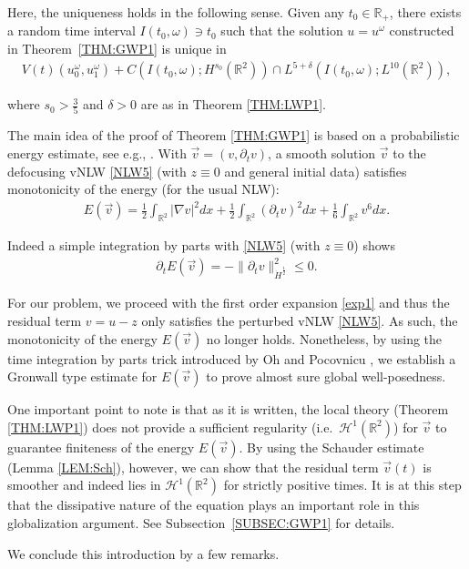 \documentclass[letterpaper, 11pt,  reqno]{amsart}
\newtheorem{remark}[theorem]{Remark}
\newcommand{\1}{\hspace{0.5mm}\text{I}\hspace{0.2mm}}
\newcommand{\noi}{\noindent}
\newcommand{\R}{\mathbb{R}}
\newcommand{\dl}{\delta}
\newcommand{\nb}{\nabla}
\newcommand{\dt}{\partial_t}
\renewcommand{\o}{\omega}
\renewcommand{\H}{\mathcal{H}}
\numberwithin{equation}{section}
\numberwithin{theorem}{section}
\begin{document}
Here, the uniqueness holds in the following sense.
Given any $t_0 \in \R_+$, there exists a random time interval $I(t_0, \o) \ni t_0$
such that the solution $u = u^\o$ constructed in Theorem~\ref{THM:GWP1}
is unique in 
\begin{align*}
V(t)(u_0^\o, u_1^\o) +  C(I(t_0, \o); H^{s_0} (\R^2))
\cap  L^{5+\dl}(I(t_0, \o);  L^{10}(\R^2)), 
\end{align*}

\noi
where $s_0 >\frac 35$ and $\dl > 0$ are as in Theorem \ref{THM:LWP1}.

The main idea of the proof of Theorem \ref{THM:GWP1} is based
on a probabilistic energy estimate, see e.g.,  \cite{BT1, OP}.
With $\vec v = (v, \dt v)$, 
a smooth solution $\vec v $ to the 
defocusing vNLW \eqref{NLW5}
(with $z \equiv 0$ and general initial data)
satisfies monotonicity of the energy (for the usual NLW):
\begin{align}
E(\vec v) = \frac 12 \int_{\R^2} |\nb v|^2 dx + \frac 12 \int_{\R^2} (\dt v)^2 dx
+ \frac 16 \int_{\R^2} v^6 dx .
\label{E0}
\end{align}

\noi
Indeed a simple integration by parts with \eqref{NLW5} (with $z \equiv 0$) shows
\begin{align*}
\dt E(\vec v) = - \|\dt v\|_{\dot H^\frac{1}{2}}^2 \leq 0.
\end{align*}


\noi
For our problem, we proceed with 
 the first order expansion \eqref{exp1}
 and thus 
the residual term $v = u-z$ only satisfies the perturbed vNLW \eqref{NLW5}.
As such,  the monotonicity of the energy $E(\vec v)$ no longer holds.
Nonetheless, by using the time integration by parts trick introduced
by Oh and Pocovnicu  \cite{OP}, 
we establish a Gronwall type estimate 
for $E(\vec v)$ to prove almost sure global well-posedness.

One important point to note is that as it is written, 
the local theory (Theorem \ref{THM:LWP1}) does not provide
a sufficient regularity (i.e.~$\H^1(\R^2)$) for $\vec v$ to guarantee finiteness of the energy $E(\vec v)$.
By using the Schauder estimate (Lemma \ref{LEM:Sch}), however, 
we can show that the residual term $\vec v(t)$ is smoother 
and indeed lies in $\H^1(\R^2)$
for strictly positive times.
It is at this step that the dissipative nature of the equation plays an important role
in this globalization argument.
See Subsection~\ref{SUBSEC:GWP1}
for details.

We conclude this introduction by a few remarks. 
\end{document}

